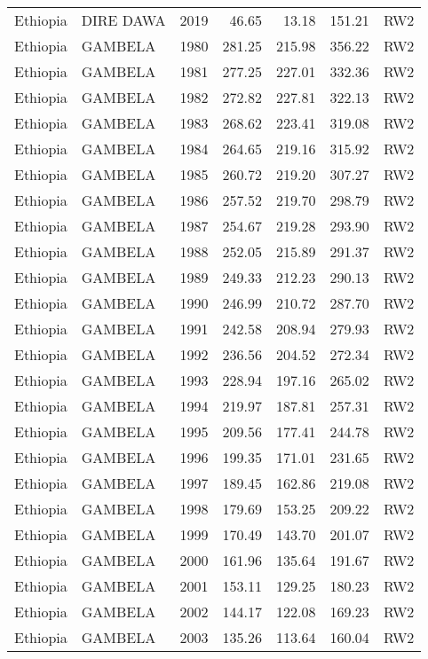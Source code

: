 \begin{longtable}{lllrrrl}
  Ethiopia & DIRE DAWA & 2019 & 46.65 & 13.18 & 151.21 & RW2 \\ 
  Ethiopia & GAMBELA & 1980 & 281.25 & 215.98 & 356.22 & RW2 \\ 
  Ethiopia & GAMBELA & 1981 & 277.25 & 227.01 & 332.36 & RW2 \\ 
  Ethiopia & GAMBELA & 1982 & 272.82 & 227.81 & 322.13 & RW2 \\ 
  Ethiopia & GAMBELA & 1983 & 268.62 & 223.41 & 319.08 & RW2 \\ 
  Ethiopia & GAMBELA & 1984 & 264.65 & 219.16 & 315.92 & RW2 \\ 
  Ethiopia & GAMBELA & 1985 & 260.72 & 219.20 & 307.27 & RW2 \\ 
  Ethiopia & GAMBELA & 1986 & 257.52 & 219.70 & 298.79 & RW2 \\ 
  Ethiopia & GAMBELA & 1987 & 254.67 & 219.28 & 293.90 & RW2 \\ 
  Ethiopia & GAMBELA & 1988 & 252.05 & 215.89 & 291.37 & RW2 \\ 
  Ethiopia & GAMBELA & 1989 & 249.33 & 212.23 & 290.13 & RW2 \\ 
  Ethiopia & GAMBELA & 1990 & 246.99 & 210.72 & 287.70 & RW2 \\ 
  Ethiopia & GAMBELA & 1991 & 242.58 & 208.94 & 279.93 & RW2 \\ 
  Ethiopia & GAMBELA & 1992 & 236.56 & 204.52 & 272.34 & RW2 \\ 
  Ethiopia & GAMBELA & 1993 & 228.94 & 197.16 & 265.02 & RW2 \\ 
  Ethiopia & GAMBELA & 1994 & 219.97 & 187.81 & 257.31 & RW2 \\ 
  Ethiopia & GAMBELA & 1995 & 209.56 & 177.41 & 244.78 & RW2 \\ 
  Ethiopia & GAMBELA & 1996 & 199.35 & 171.01 & 231.65 & RW2 \\ 
  Ethiopia & GAMBELA & 1997 & 189.45 & 162.86 & 219.08 & RW2 \\ 
  Ethiopia & GAMBELA & 1998 & 179.69 & 153.25 & 209.22 & RW2 \\ 
  Ethiopia & GAMBELA & 1999 & 170.49 & 143.70 & 201.07 & RW2 \\ 
  Ethiopia & GAMBELA & 2000 & 161.96 & 135.64 & 191.67 & RW2 \\ 
  Ethiopia & GAMBELA & 2001 & 153.11 & 129.25 & 180.23 & RW2 \\ 
  Ethiopia & GAMBELA & 2002 & 144.17 & 122.08 & 169.23 & RW2 \\ 
  Ethiopia & GAMBELA & 2003 & 135.26 & 113.64 & 160.04 & RW2 \\ 

\end{longtable}
